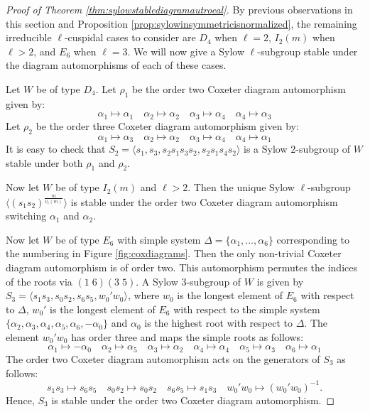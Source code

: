\documentclass[12pt]{amsart}
\theoremstyle{plain}
\theoremstyle{definition}
\numberwithin{equation}{section}
\numberwithin{equation}{section}
\begin{document}
	
	\begin{proof}[Proof of Theorem \ref{thm:sylowstablediagramautroeal}]
		By previous observations in this section and Proposition \ref{prop:sylowinsymmetricisnormalized}, the remaining irreducible $\ell$-cuspidal cases to consider are $D_4$ when $\ell=2$, $I_2(m)$ when $\ell>2$, and $E_6$ when $\ell=3$. We will now give a Sylow $\ell$-subgroup stable under the diagram automorphisms of each of these cases.
		
		Let $W$ be of type $D_4$. Let $\rho_1$ be the order two Coxeter diagram automorphism given by:  \[\alpha_1\mapsto \alpha_1 \hspace{1em} \alpha_2\mapsto \alpha_2 \hspace{1em} \alpha_3\mapsto \alpha_4 \hspace{1em} \alpha_4\mapsto \alpha_3\] Let $\rho_2$ be the order three Coxeter diagram automorphism given by: \[\alpha_1\mapsto \alpha_3 \hspace{1em} \alpha_2\mapsto \alpha_2 \hspace{1em} \alpha_3\mapsto \alpha_4 \hspace{1em} \alpha_4\mapsto \alpha_1\]
		It is easy to check that $S_2=\langle s_1,s_3,s_2s_1s_3s_2,s_2s_1s_4s_2\rangle$ is a Sylow $2$-subgroup of $W$ stable under both $\rho_1$ and $\rho_2$.
		
		Now let $W$ be of type $I_2(m)$ and $\ell>2$. Then the unique Sylow $\ell$-subgroup $\langle (s_1s_2)^\frac{m}{\nu_\ell(m)}  \rangle$ is stable under the order two Coxeter diagram automorphism switching $\alpha_1$ and $\alpha_2$.
		
		Now let $W$ be of type $E_6$ with simple system $\Delta=\{\alpha_1,\dots,\alpha_6\}$ corresponding to the numbering in Figure \ref{fig:coxdiagrams}. Then the only non-trivial Coxeter diagram automorphism is of order two. This automorphism permutes the indices of the roots via $(1\; 6)(3\; 5)$. A Sylow $3$-subgroup of $W$ is given by $S_3=\langle s_1s_3,s_0s_2,s_6s_5,w_0'w_0\rangle$,
		where $w_0$ is the longest element of $E_6$ with respect to $\Delta$, $w_0'$ is the longest element of $E_6$ with respect to the simple system $\{\alpha_2,\alpha_3,\alpha_4,\alpha_5,\alpha_6,-\alpha_0\}$ and $\alpha_0$ is the highest root with respect to $\Delta$. The element $w_0'w_0$ has order three and maps the simple roots as follows:
		\[\alpha_1 \mapsto -\alpha_0 \hspace{1em} \alpha_2 \mapsto\alpha_5 \hspace{1em} \alpha_3 \mapsto \alpha_2 \hspace{1em} \alpha_4 \mapsto \alpha_4 \hspace{1em} \alpha_5 \mapsto \alpha_3 \hspace{1em} \alpha_6  \mapsto \alpha_1\]
		The order two Coxeter diagram automorphism acts on the generators of $S_3$ as follows:
		\[s_1s_3 \mapsto s_6s_5 \hspace{1em} s_0s_2\mapsto s_0s_2 \hspace{1em} s_6s_5\mapsto s_1s_3 \hspace{1em} w_0'w_0\mapsto (w_0'w_0)^{-1}.\] Hence, $S_3$ is stable under the order two Coxeter diagram automorphism.
		

\end{proof}
\end{document}
